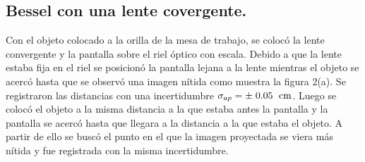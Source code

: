 \documentclass[DIV=calc, paper=a4, fontsize=10pt]{scrartcl}
\begin{document}
\subsection*{\textcolor{carmine}{Bessel con una lente covergente.}}
Con el objeto colocado a la orilla de la mesa de trabajo, se colocó la lente convergente y la pantalla sobre el riel óptico con escala. Debido a que la lente estaba fija en el riel se posicionó la pantalla lejana a la lente mientras el objeto se acercó hasta que se observó una imagen nítida como muestra la figura 2(a). Se registraron las distancias con una incertidumbre $\sigma_{ap}=\pm\hspace{0.1cm}0.05\hspace{0.1cm}\text{ cm}$.
Luego se colocó el objeto a la misma distancia a la que estaba antes la pantalla y la pantalla se acercó hasta que llegara a la distancia a la que estaba el objeto. A partir de ello se buscó el punto en el que la imagen proyectada se viera más nítida y fue registrada con la misma incertidumbre. 
\end{document}
